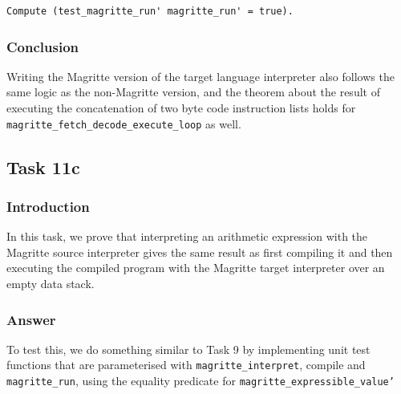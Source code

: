 \documentclass{article}
\begin{document}
\begin{lstlisting}
Compute (test_magritte_run' magritte_run' = true).
\end{lstlisting}

\subsubsection{Conclusion}
Writing the Magritte version of the target language interpreter also follows the same logic as the non-Magritte version, and the theorem about the result of executing the concatenation of two byte code instruction lists holds for \texttt{magritte\_fetch\_decode\_execute\_loop} as well.

\subsection{Task 11c}
\subsubsection{Introduction}
In this task, we prove that interpreting an arithmetic expression with the Magritte source interpreter gives the same result as first compiling it and then executing the compiled program with the Magritte target interpreter over an empty data stack.

\subsubsection{Answer}
To test this, we do something similar to Task 9 by implementing unit test functions that are parameterised with \texttt{magritte\_interpret}, compile and \texttt{magritte\_run}, using the equality predicate for \texttt{magritte\_expressible\_value'}
\end{document}

